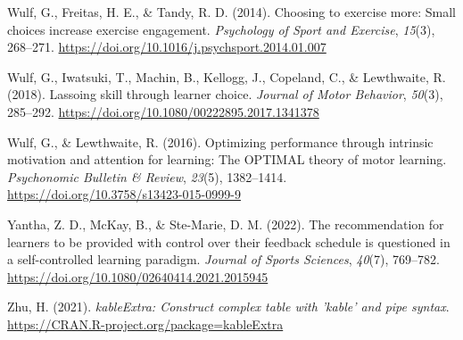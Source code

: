 \documentclass[
  doc, donotrepeattitle,floatsintext]{apa7}
\newlength{\cslhangindent}
\newlength{\cslentryspacingunit} %
\newenvironment{CSLReferences}[2] %
 {%
  \setlength{\parindent}{0pt}
  \ifodd #1
  \let\oldpar\par
  \def\par{\hangindent=\cslhangindent\oldpar}
  \fi
  \setlength{\parskip}{#2\cslentryspacingunit}
 }%
 {}
\begin{document}
\begin{CSLReferences}{1}{0}
\leavevmode{}%
Wulf, G., Freitas, H. E., \& Tandy, R. D. (2014). Choosing to exercise more: {Small} choices increase exercise engagement. \emph{Psychology of Sport and Exercise}, \emph{15}(3), 268--271. \url{https://doi.org/10.1016/j.psychsport.2014.01.007}

\leavevmode{}%
Wulf, G., Iwatsuki, T., Machin, B., Kellogg, J., Copeland, C., \& Lewthwaite, R. (2018). Lassoing skill through learner choice. \emph{Journal of Motor Behavior}, \emph{50}(3), 285--292. \url{https://doi.org/10.1080/00222895.2017.1341378}

\leavevmode{}%
Wulf, G., \& Lewthwaite, R. (2016). Optimizing performance through intrinsic motivation and attention for learning: {The OPTIMAL} theory of motor learning. \emph{Psychonomic Bulletin \& Review}, \emph{23}(5), 1382--1414. \url{https://doi.org/10.3758/s13423-015-0999-9}

\leavevmode{}%
Yantha, Z. D., McKay, B., \& Ste-Marie, D. M. (2022). The recommendation for learners to be provided with control over their feedback schedule is questioned in a self-controlled learning paradigm. \emph{Journal of Sports Sciences}, \emph{40}(7), 769--782. \url{https://doi.org/10.1080/02640414.2021.2015945}

\leavevmode{}%
Zhu, H. (2021). \emph{kableExtra: Construct complex table with 'kable' and pipe syntax}. \url{https://CRAN.R-project.org/package=kableExtra}

\end{CSLReferences}
\end{document}
